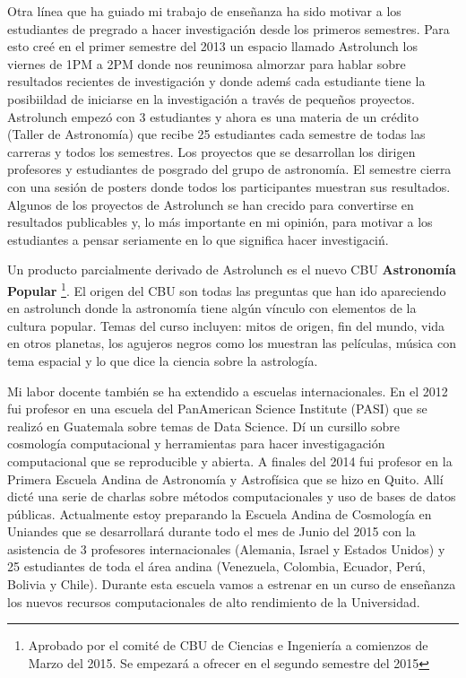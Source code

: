 \documentclass[letterpaper,12pt,onecolumn]{article}
\begin{document}
Otra l\'inea que ha guiado mi trabajo de ense\~nanza ha sido motivar a los estudiantes de pregrado a hacer investigaci\'on desde los primeros semestres. Para
esto cre\'e en el primer semestre del 2013 un espacio llamado Astrolunch
los viernes de 1PM a 2PM donde nos reunimosa almorzar para hablar
sobre resultados recientes de investigaci\'on y donde adem\'s cada
estudiante tiene la posibiildad de iniciarse en la investigaci\'on a
trav\'es de peque\~nos proyectos. Astrolunch empez\'o con 3 estudiantes y
ahora es una materia de un cr\'edito (Taller de Astronom\'ia) que recibe
25 estudiantes cada semestre de todas las carreras y todos los
semestres. Los proyectos que se desarrollan los dirigen profesores y
estudiantes de posgrado del grupo de astronomía. El semestre cierra
con una sesi\'on de posters donde todos los participantes muestran sus
resultados. Algunos de los proyectos de Astrolunch se han crecido para
convertirse en resultados publicables y, lo m\'as importante en mi
opini\'on, para motivar a los estudiantes a pensar seriamente en lo
que significa hacer investigaci\' n. 


Un producto parcialmente derivado de Astrolunch es el nuevo CBU {\bf
  Astronom\'ia Popular} \footnote{Aprobado por el comit\'e de CBU de Ciencias e
  Ingenier\'ia a comienzos de Marzo del 2015. Se empezar\'a a ofrecer
  en el segundo semestre del 2015}. El origen del CBU son todas las
preguntas que han ido apareciendo en astrolunch donde la astronom\'ia
tiene alg\'un v\'inculo con elementos de la cultura popular. Temas del
curso incluyen: mitos de origen, fin del mundo, vida en otros planetas,
los agujeros negros como los muestran las pel\'iculas, m\'usica con tema
espacial y lo que dice la ciencia sobre la astrolog\'ia.

Mi labor docente tambi\'en se ha extendido a escuelas
internacionales. En el 2012 fui profesor en una escuela del
PanAmerican Science Institute (PASI) que se realiz\'o en Guatemala sobre
temas de Data Science. D\'i un cursillo sobre cosmolog\'ia
computacional y herramientas para hacer investigagaci\'on computacional
que se reproducible y abierta. A finales del 2014 fui profesor en la
Primera Escuela Andina de Astronom\'ia y Astrof\'isica que se hizo en
Quito. All\'i dict\'e una serie de charlas sobre m\'etodos computacionales y
uso de bases de datos p\'ublicas. Actualmente estoy preparando la
Escuela Andina de Cosmolog\'ia en Uniandes que se desarrollar\'a durante
todo el mes de Junio del 2015 con la asistencia de 3 profesores
internacionales (Alemania, Israel y Estados Unidos) y 25 estudiantes
de toda el \'area andina (Venezuela, Colombia, Ecuador, Per\'u, Bolivia y
Chile). Durante esta escuela vamos a estrenar en un curso de
ense\~nanza los nuevos recursos computacionales de alto rendimiento de
la Universidad.
\end{document}
